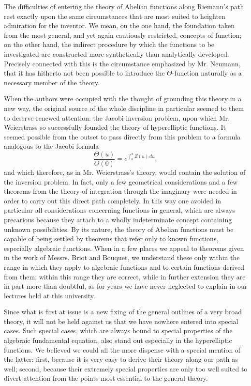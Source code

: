\documentclass[10pt]{article}
\begin{document}
The difficulties of entering the theory of Abelian functions along Riemann's path rest exactly upon the same circumstances that are most suited to heighten admiration for the inventor. We mean, on the one hand, the foundation taken from the most general, and yet again cautiously restricted, concepts of function; on the other hand, the indirect procedure by which the functions to be investigated are constructed more synthetically than analytically developed. Precisely connected with this is the circumstance emphasized by Mr. Neumann, that it has hitherto not been possible to introduce the $\Theta$-function naturally as a necessary member of the theory.

When the authors were occupied with the thought of grounding this theory in a new way, the original source of the whole discipline in particular seemed to them to deserve renewed attention: the Jacobi inversion problem, upon which Mr. Weierstrass so successfully founded the theory of hyperelliptic functions. It seemed possible from the outset to pass directly from this problem to a formula analogous to the Jacobi formula
\[
\frac{\Theta(u)}{\Theta(0)}=e^{\int_0^u Z(u)\,du},
\]
and which therefore, as in Mr. Weierstrass's theory, would contain the solution of the inversion problem. In fact, only a few geometrical considerations and a few theorems from the theory of integration through the imaginary were needed in order to carry out this direct path completely. In this way one avoided in particular all considerations concerning functions in general, which are always precarious because they attach to a wholly indeterminate concept containing unknown possibilities. By its nature, the theory of Abelian functions must be capable of being settled by theorems that refer only to known functions, especially algebraic functions. When in a few places we appeal to theorems given in the work of Messrs. Briot and Bouquet, we understand these only within the range in which they apply to algebraic functions and to certain functions derived from them; within this range they are correct, while in further extension they are in part more than doubtful, as for years we have never neglected to explain in our lectures held at this university.

Since what is first at issue is a new fixing of the general outlines of a very broad theory, it will not be held against us that we have nowhere entered into special cases. Such special cases, which are always bound to special properties of the algebraic fundamental equation, also stand out especially in the hyperelliptic functions. We believed we could all the more dispense with a special mention of the latter: first, because it is very easy to derive their theory along our path as well; second, because their extremely special properties are only too well suited to divert attention from the points most essential to the general theory.
\end{document}
